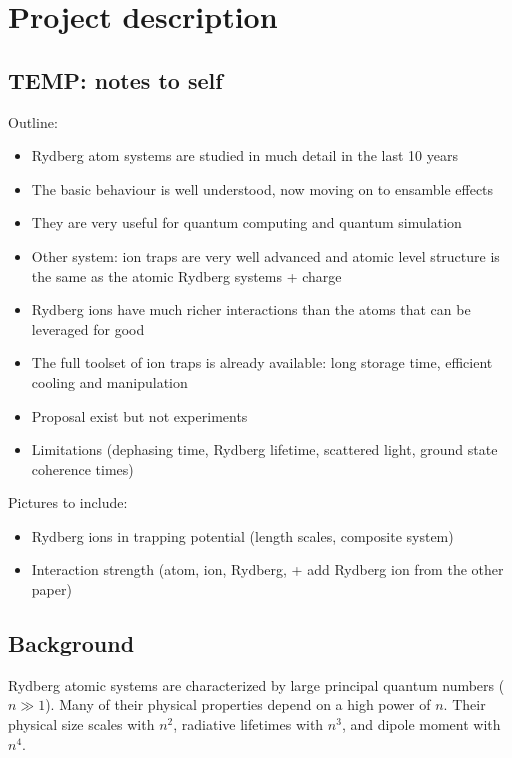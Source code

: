 \section{Project description}

\subsection{TEMP: notes to self}

Outline:

\begin{itemize}
 \item Rydberg atom systems are studied in much detail in the last 10 years
 \item The basic behaviour is well understood, now moving on to ensamble effects
 \item They are very useful for quantum computing and quantum simulation
 \item Other system: ion traps are very well advanced and atomic level structure is the same as the atomic Rydberg systems + charge
 \item Rydberg ions have much richer interactions than the atoms that can be leveraged for good
 \item The full toolset of ion traps is already available: long storage time, efficient cooling and manipulation
 \item Proposal exist but not experiments
 \item Limitations (dephasing time, Rydberg lifetime, scattered light, ground state coherence times)
\end{itemize}

Pictures to include:

\begin{itemize}
 \item Rydberg ions in trapping potential (length scales, composite system)
 \item Interaction strength (atom, ion, Rydberg, + add Rydberg ion from the other paper)
\end{itemize}




\subsection{Background}

Rydberg atomic systems are characterized by large principal quantum numbers ($n \gg 1$). Many of their physical properties depend on a high power of $n$. Their physical size scales with $n^2$, radiative lifetimes with $n^3$, and dipole moment with $n^4$.

